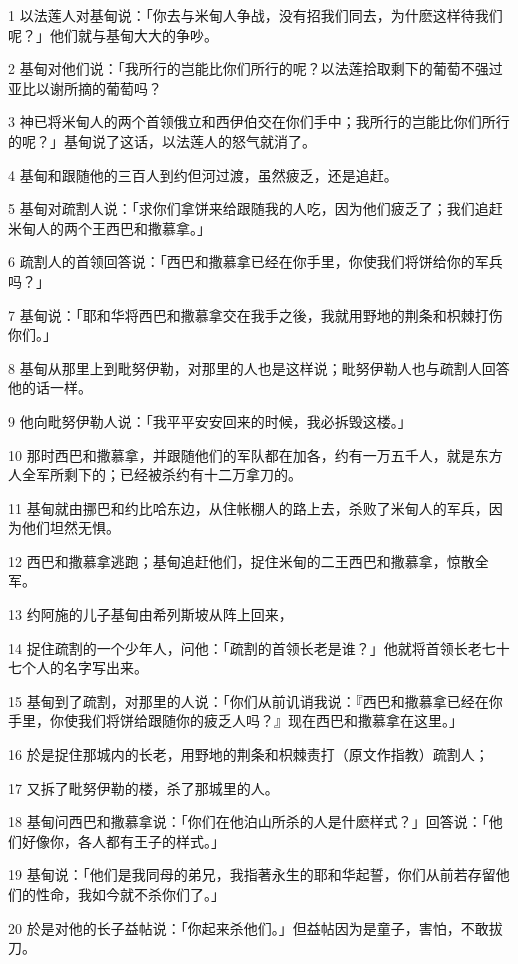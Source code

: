 \par 1 以法莲人对基甸说：「你去与米甸人争战，没有招我们同去，为什麽这样待我们呢？」他们就与基甸大大的争吵。
\par 2 基甸对他们说：「我所行的岂能比你们所行的呢？以法莲拾取剩下的葡萄不强过亚比以谢所摘的葡萄吗？
\par 3 神已将米甸人的两个首领俄立和西伊伯交在你们手中；我所行的岂能比你们所行的呢？」基甸说了这话，以法莲人的怒气就消了。
\par 4 基甸和跟随他的三百人到约但河过渡，虽然疲乏，还是追赶。
\par 5 基甸对疏割人说：「求你们拿饼来给跟随我的人吃，因为他们疲乏了；我们追赶米甸人的两个王西巴和撒慕拿。」
\par 6 疏割人的首领回答说：「西巴和撒慕拿已经在你手里，你使我们将饼给你的军兵吗？」
\par 7 基甸说：「耶和华将西巴和撒慕拿交在我手之後，我就用野地的荆条和枳棘打伤你们。」
\par 8 基甸从那里上到毗努伊勒，对那里的人也是这样说；毗努伊勒人也与疏割人回答他的话一样。
\par 9 他向毗努伊勒人说：「我平平安安回来的时候，我必拆毁这楼。」
\par 10 那时西巴和撒慕拿，并跟随他们的军队都在加各，约有一万五千人，就是东方人全军所剩下的；已经被杀约有十二万拿刀的。
\par 11 基甸就由挪巴和约比哈东边，从住帐棚人的路上去，杀败了米甸人的军兵，因为他们坦然无惧。
\par 12 西巴和撒慕拿逃跑；基甸追赶他们，捉住米甸的二王西巴和撒慕拿，惊散全军。
\par 13 约阿施的儿子基甸由希列斯坡从阵上回来，
\par 14 捉住疏割的一个少年人，问他：「疏割的首领长老是谁？」他就将首领长老七十七个人的名字写出来。
\par 15 基甸到了疏割，对那里的人说：「你们从前讥诮我说：『西巴和撒慕拿已经在你手里，你使我们将饼给跟随你的疲乏人吗？』现在西巴和撒慕拿在这里。」
\par 16 於是捉住那城内的长老，用野地的荆条和枳棘责打（原文作指教）疏割人；
\par 17 又拆了毗努伊勒的楼，杀了那城里的人。
\par 18 基甸问西巴和撒慕拿说：「你们在他泊山所杀的人是什麽样式？」回答说：「他们好像你，各人都有王子的样式。」
\par 19 基甸说：「他们是我同母的弟兄，我指著永生的耶和华起誓，你们从前若存留他们的性命，我如今就不杀你们了。」
\par 20 於是对他的长子益帖说：「你起来杀他们。」但益帖因为是童子，害怕，不敢拔刀。
